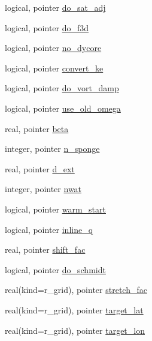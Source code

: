 \begin{DoxyCompactItemize}
\item 
logical, pointer \hyperlink{classfv__control__mod_a0abb7b731ab56c18f0ad1d1e19867c2a}{do\-\_\-sat\-\_\-adj}
\item 
logical, pointer \hyperlink{classfv__control__mod_a27ffd44f2834dd58dc395929f979cd0b}{do\-\_\-f3d}
\item 
logical, pointer \hyperlink{classfv__control__mod_af6f083211eda48e5d40ed207ccc75dac}{no\-\_\-dycore}
\item 
logical, pointer \hyperlink{classfv__control__mod_ad752cc0b235be8111c1e0535ee4ab5be}{convert\-\_\-ke}
\item 
logical, pointer \hyperlink{classfv__control__mod_af67a5101144aa261557a851a6d696f71}{do\-\_\-vort\-\_\-damp}
\item 
logical, pointer \hyperlink{classfv__control__mod_a47cc705f642ad3e11f7ae4bef4d35572}{use\-\_\-old\-\_\-omega}
\item 
real, pointer \hyperlink{classfv__control__mod_a5d1a537c7dbc2feea09ca52d1c0f3a1a}{beta}
\item 
integer, pointer \hyperlink{classfv__control__mod_aa49e642e289810bd0ae3e8d564ca9daa}{n\-\_\-sponge}
\item 
real, pointer \hyperlink{classfv__control__mod_ac3f8891ff52f95a7ed8a495518ba3321}{d\-\_\-ext}
\item 
integer, pointer \hyperlink{classfv__control__mod_acedcdd0be0664497b28861c69b006c40}{nwat}
\item 
logical, pointer \hyperlink{classfv__control__mod_a902561af942a30ae404d58555bcf849c}{warm\-\_\-start}
\item 
logical, pointer \hyperlink{classfv__control__mod_afcc0691ad688ba6c0403a246913ce4b8}{inline\-\_\-q}
\item 
real, pointer \hyperlink{classfv__control__mod_a9578e6526f4ae8e6707ba795b3ca8f1f}{shift\-\_\-fac}
\item 
logical, pointer \hyperlink{classfv__control__mod_a7c583929b563afebe8c3928541715f28}{do\-\_\-schmidt}
\item 
real(kind=r\-\_\-grid), pointer \hyperlink{classfv__control__mod_a8bf7e998d37424a5acfd20a1d4345655}{stretch\-\_\-fac}
\item 
real(kind=r\-\_\-grid), pointer \hyperlink{classfv__control__mod_ab6c815af85f5ad4e350b9a70e835863b}{target\-\_\-lat}
\item 
real(kind=r\-\_\-grid), pointer \hyperlink{classfv__control__mod_a4be1f3d3b7f0f82146aabd90d5b1aee9}{target\-\_\-lon}
\item 

\end{DoxyCompactItemize}
